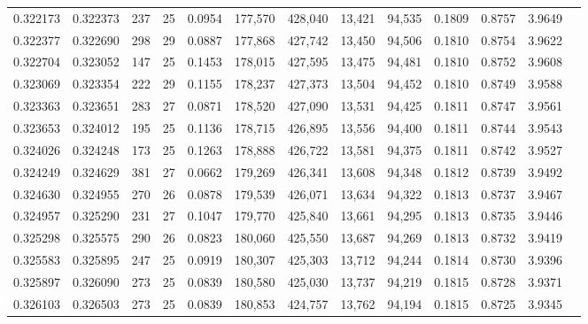 \begin{tabular}{rrrrrrrrrrrrr}
0.322173 & 0.322373 &   237 &  25 &                                     0.0954 & 177,570 & 428,040 &  13,421 &  94,535 & 0.1809 & 0.8757 & 3.9649 \\
0.322377 & 0.322690 &   298 &  29 &                                     0.0887 & 177,868 & 427,742 &  13,450 &  94,506 & 0.1810 & 0.8754 & 3.9622 \\
0.322704 & 0.323052 &   147 &  25 &                                     0.1453 & 178,015 & 427,595 &  13,475 &  94,481 & 0.1810 & 0.8752 & 3.9608 \\
0.323069 & 0.323354 &   222 &  29 &                                     0.1155 & 178,237 & 427,373 &  13,504 &  94,452 & 0.1810 & 0.8749 & 3.9588 \\
0.323363 & 0.323651 &   283 &  27 &                                     0.0871 & 178,520 & 427,090 &  13,531 &  94,425 & 0.1811 & 0.8747 & 3.9561 \\
0.323653 & 0.324012 &   195 &  25 &                                     0.1136 & 178,715 & 426,895 &  13,556 &  94,400 & 0.1811 & 0.8744 & 3.9543 \\
0.324026 & 0.324248 &   173 &  25 &                                     0.1263 & 178,888 & 426,722 &  13,581 &  94,375 & 0.1811 & 0.8742 & 3.9527 \\
0.324249 & 0.324629 &   381 &  27 &                                     0.0662 & 179,269 & 426,341 &  13,608 &  94,348 & 0.1812 & 0.8739 & 3.9492 \\
0.324630 & 0.324955 &   270 &  26 &                                     0.0878 & 179,539 & 426,071 &  13,634 &  94,322 & 0.1813 & 0.8737 & 3.9467 \\
0.324957 & 0.325290 &   231 &  27 &                                     0.1047 & 179,770 & 425,840 &  13,661 &  94,295 & 0.1813 & 0.8735 & 3.9446 \\
0.325298 & 0.325575 &   290 &  26 &                                     0.0823 & 180,060 & 425,550 &  13,687 &  94,269 & 0.1813 & 0.8732 & 3.9419 \\
0.325583 & 0.325895 &   247 &  25 &                                     0.0919 & 180,307 & 425,303 &  13,712 &  94,244 & 0.1814 & 0.8730 & 3.9396 \\
0.325897 & 0.326090 &   273 &  25 &                                     0.0839 & 180,580 & 425,030 &  13,737 &  94,219 & 0.1815 & 0.8728 & 3.9371 \\
0.326103 & 0.326503 &   273 &  25 &                                     0.0839 & 180,853 & 424,757 &  13,762 &  94,194 & 0.1815 & 0.8725 & 3.9345 \\

\end{tabular}
